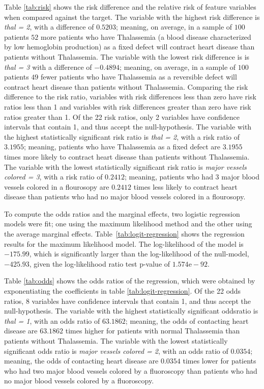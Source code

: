 




Table \ref{tab:risk} shows the risk difference and the relative risk of feature variables when compared against the target.
The variable with the highest risk difference is \emph{thal = 2}, with a difference of $0.5203$; meaning, on average, in a sample of $100$ patients $52$ more patients who have Thalassemia (a blood disease characterized by low hemoglobin production) as a fixed defect will contract heart disease than patients without Thalassemia.
The variable with the lowest risk difference is is \emph{thal = 3} with a difference of $-0.4894$; meaning, on average, in a sample of $100$ patients $49$ fewer patients who have Thalassemia as a reversible defect will contract heart disease than patients without Thalassemia. 
Comparing the risk difference to the risk ratio, variables with risk differences less than zero have risk ratios less than 1 and variables with risk differences greater than zero have risk ratios greater than 1. 
Of the 22 risk ratios, only 2 variables have confidence intervals that contain 1, and thus accept the null-hypothesis. 
The variable with the highest statistically significant risk ratio is \emph{thal = 2}, with a risk ratio of $3.1955$; meaning, patients who have Thalassemia as a fixed defect are $3.1955$ times more likely to contract heart disease than patients without Thalassemia.
The variable with the lowest statistically significant risk ratio is \emph{major vessels colored = 3}, with a risk ratio of $0.2412$; meaning, patients who had 3 major blood vessels colored in a flourosopy are $0.2412$ times less likely to contract heart disease than patients who had no major blood vessels colored in a flourosopy.


To compute the odds ratios and the marginal effects, two logistic regression models were fit; one using the maximum likelihood method and the other using the average marginal effects.
Table~\ref{tab:logit-regression} shows the regression results for the maximum likelihood model.
The log-likelihood of the model is $-175.99$, which is significantly larger than the log-likelihood of the null-model, $-425.93$, given the log-likelihood ratio test p-value of $1.574\mathrm{e-}92$.

Table \ref{tab:odds} shows the odds ratios of the regression, which were obtained by exponentiating the coefficients in table \ref{tab:logit-regression}.
Of the 22 odds ratios, 8 variables have confidence intervals that contain 1, and thus accept the null-hypothesis.
The variable with the highest statistically significant oddsratio is \emph{thal = 1}, with an odds ratio of $63.1862$; meaning, the odds of contacting heart disease are $63.1862$ times higher for patients with normal Thalassemia than patients without Thalassemia.
The variable with the lowest statistically significant odds ratio is \emph{major vessels colored = 2}, with an odds ratio of $0.0354$; meaning, the odds of contacting heart disease are $0.0354$ times lower for patients who had two major blood vessels colored by a fluoroscopy than patients who had no major blood vessels colored by a fluoroscopy.

